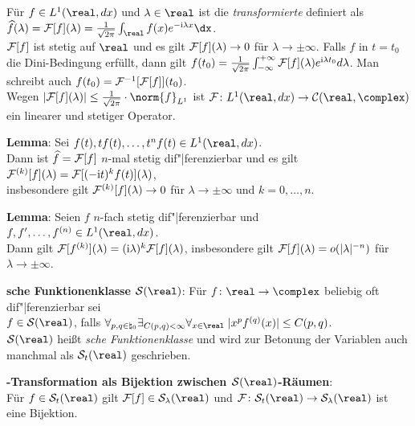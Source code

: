 Für $f \in L^1(\real, dx)$ und $\lambda \in \real$ ist die
\emph{transformierte} definiert als\\
$\widehat{f}(\lambda) = \F[f](\lambda) =
\frac{1}{\sqrt{2\pi}} \int_\real f(x) e^{-\i\lambda x}\dx$.\\
$\mathcal{F}[f]$ ist stetig auf $\real$ und es gilt $\mathcal{F}[f](\lambda) \to 0$ für
$\lambda \to \pm\infty$.
Falls $f$ in $t = t_0$ die Dini-Bedingung erfüllt, dann gilt
$f(t_0) = \frac{1}{\sqrt{2\pi}}
\int_{-\infty}^{+\infty} \mathcal{F}[f](\lambda) e^{\mathrm{i}\lambda t_0} d\lambda$.
Man schreibt auch $f(t_0) = \mathcal{F}^{-1}[\mathcal{F}[f]](t_0)$.\\
Wegen $|\F[f](\lambda)| \le \frac{1}{\sqrt{2\pi}} \cdot \norm{f}_{L^1}$ ist
$\F\colon L^1(\real, dx) \rightarrow \C(\real, \complex)$ ein linearer und
stetiger Operator.

\linie

\textbf{Lemma}:
Sei $f(t), t f(t), \dotsc, t^n f(t) \in L^1(\real, dx)$.\\
Dann ist $\widehat{f} = \mathcal{F}[f]$ $n$-mal stetig dif"|ferenzierbar und es gilt
$\mathcal{F}^{(k)}[f](\lambda) = \mathcal{F}[(-\mathrm{i} t)^k f(t)](\lambda)$,\\
insbesondere gilt $\mathcal{F}^{(k)}[f](\lambda) \to 0$ für $\lambda \to \pm\infty$ und
$k = 0, \dotsc, n$.

\textbf{Lemma}:
Seien $f$ $n$-fach stetig dif"|ferenzierbar und
$f, f', \dotsc, f^{(n)} \in L^1(\real, dx)$.\\
Dann gilt $\mathcal{F}[f^{(k)}](\lambda) = (\mathrm{i}\lambda)^k \mathcal{F}[f](\lambda)$,
insbesondere gilt $\mathcal{F}[f](\lambda) = o(|\lambda|^{-n})$ für
$\lambda \to \pm\infty$.

\linie

\textbf{sche Funktionenklasse $\S(\real)$}:
Für $f \colon \real \rightarrow \complex$ beliebig oft dif"|ferenzierbar sei\\
$f \in \S(\real)$, falls
$\forall_{p, q \in \natural_0} \exists_{C(p, q) < \infty}
\forall_{x \in \real}\; |x^p f^{(q)}(x)| \le C(p, q)$.\\
$\S(\real)$ heißt \emph{sche Funktionenklasse} und wird zur
Betonung der Variablen auch manchmal als $\S_t(\real)$ geschrieben.

\textbf{-Transformation als Bijektion zwischen
$\S(\real)$-Räumen}:\\
Für $f \in \S_t(\real)$ gilt
$\F[f] \in \S_\lambda(\real)$ und
$\F\colon \S_t(\real) \rightarrow \S_\lambda(\real)$ ist eine Bijektion.

\linie

